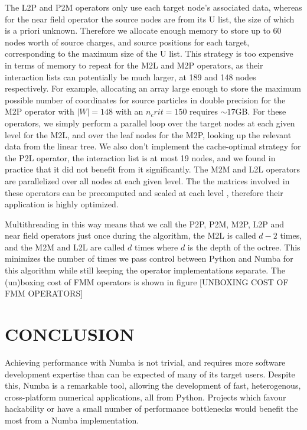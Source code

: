 \documentclass{IEEEcsmag}
\begin{document}
The L2P and P2M operators only use each target node's associated data, whereas for the near field operator the source nodes are from its U list, the size of which is a priori unknown. Therefore we allocate enough memory to store up to 60 nodes worth of source charges, and source positions for each target, corresponding to the maximum size of the U list. This strategy is too expensive in terms of memory to repeat for the M2L and M2P operators, as their interaction lists can potentially be much larger, at 189 and 148 nodes respectively. For example, allocating an array large enough to store the maximum possible number of coordinates for source particles in double precision for the M2P operator with $|W|=148$ with an $n_crit=150$ requires $\sim 17$GB. For these operators, we simply perform a parallel loop over the target nodes at each given level for the M2L, and over the leaf nodes for the M2P, looking up the relevant data from the linear tree. We also don't implement the cache-optimal strategy for the P2L operator, the interaction list is at most 19 nodes, and we found in practice that it did not benefit from it significantly. The M2M and L2L operators are parallelized over all nodes at each given level. The the matrices involved in these operators can be precomputed and scaled at each level \cite{Wang2021}, therefore their application is highly optimized.

Multithreading in this way means that we call the P2P, P2M, M2P, L2P and near field operators just once during the algorithm, the M2L is called $d-2$ times, and the M2M and L2L are called $d$ times where $d$ is the depth of the octree. This minimizes the number of times we pass control between Python and Numba for this algorithm while still keeping the operator implementations separate. The (un)boxing cost of FMM operators is shown in figure [UNBOXING COST OF FMM OPERATORS]

\section{CONCLUSION}

Achieving performance with Numba is not trivial, and requires more software development expertise than can be expected of many of its target users. Despite this, Numba is a remarkable tool, allowing the development of fast, heterogenous, cross-platform numerical applications, all from Python. Projects which favour hackability or have a small number of performance bottlenecks would benefit the most from a Numba implementation.
\end{document}

